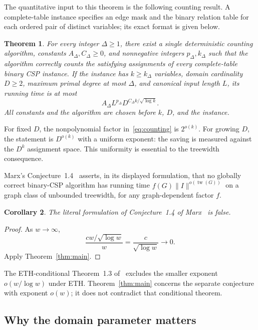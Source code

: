 \documentclass[11pt,reqno]{amsart}
\numberwithin{equation}{section}
\newtheorem{theorem}{Theorem}[section]
\newtheorem{corollary}[theorem]{Corollary}
\theoremstyle{definition}
\theoremstyle{remark}
\newcommand{\tw}{\operatorname{tw}}
\begin{document}
The quantitative input to this theorem is the following counting result. A complete-table instance specifies an edge mask and the binary relation table for each ordered pair of distinct variables; its exact format is given below.

\begin{theorem}\label{thm:counting}
For every integer $\Delta\ge1$, there exist a single deterministic counting algorithm, constants $A_\Delta,C_\Delta\ge0$, and nonnegative integers $p_\Delta,k_\Delta$ such that the algorithm correctly counts the satisfying assignments of every complete-table binary CSP instance. If the instance has $k\ge k_\Delta$ variables, domain cardinality $D\ge2$, maximum primal degree at most $\Delta$, and canonical input length $L$, its running time is at most
\begin{equation}\label{eq:counting}
 A_\Delta L^{p_\Delta}D^{C_\Delta k/\sqrt{\log k}}.
\end{equation}
All constants and the algorithm are chosen before $k$, $D$, and the instance.
\end{theorem}

For fixed $D$, the nonpolynomial factor in~\eqref{eq:counting} is $2^{o(k)}$. For growing $D$, the statement is $D^{o(k)}$ with a uniform exponent: the saving is measured against the $D^k$ assignment space. This uniformity is essential to the treewidth consequence.

Marx's Conjecture~1.4~\cite[p.~88]{Marx10} asserts, in its displayed formulation, that no globally correct binary-CSP algorithm has running time $f(G)\lVert I\rVert^{o(\tw(G))}$ on a graph class of unbounded treewidth, for any graph-dependent factor $f$.

\begin{corollary}\label{cor:marx}
The literal formulation of Conjecture~1.4 of Marx~\cite{Marx10} is false.
\end{corollary}
\begin{proof}
As $w\to\infty$,
\[
 \frac{c w/\sqrt{\log w}}{w}=\frac{c}{\sqrt{\log w}}\longrightarrow0.
\]
Apply Theorem~\ref{thm:main}.
\end{proof}

The ETH-conditional Theorem~1.3 of~\cite{Marx10} excludes the smaller exponent $o(w/\log w)$ under ETH. Theorem~\ref{thm:main} concerns the separate conjecture with exponent $o(w)$; it does not contradict that conditional theorem.

\subsection{Why the domain parameter matters}\label{sec:uniformity}
\end{document}
